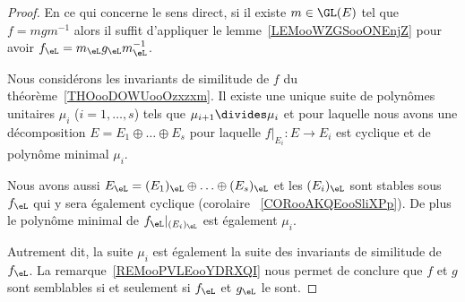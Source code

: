 \begin{proof}
	En ce qui concerne le sens direct, si il existe \( m\in\GL(E)\) tel que \( f=mgm^{-1}\) alors il suffit d'appliquer le lemme~\ref{LEMooWZGSooONEnjZ} pour avoir \( f_{\eL}=m_{\eL}g_{\eL}m_{\eL}^{-1}\).

	Nous considérons les invariants de similitude de \( f\) du théorème~\ref{THOooDOWUooOzxzxm}. Il existe une unique suite de polynômes unitaires \( \mu_i\) (\( i=1,\ldots, s\)) tels que \( \mu_{i+1}\divides \mu_i\) et pour laquelle nous avons une décomposition \( E=E_1\oplus \ldots\oplus E_s\) pour laquelle \( f|_{E_i}\colon E\to E_i\) est cyclique et de polynôme minimal \( \mu_i\).

	Nous avons aussi \( E_{\eL}=(E_1)_{\eL}\oplus\ldots \oplus (E_s)_{\eL}\) et les \( (E_i)_{\eL}\) sont stables sous \( f_{\eL}\) qui y sera également cyclique (corolaire ~\ref{CORooAKQEooSliXPp}). De plus le polynôme minimal de \( f_{\eL}|_{(E_i)_{\eL}}\) est également \( \mu_i\).

	Autrement dit, la suite \( \mu_i\) est également la suite des invariants de similitude de \( f_{\eL}\). La remarque~\ref{REMooPVLEooYDRXQI} nous permet de conclure que \( f\) et \( g\) sont semblables si et seulement si \( f_{\eL}\) et \( g_{\eL}\) le sont.
\end{proof}
